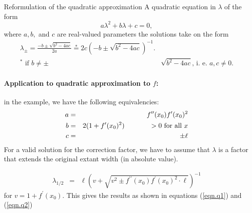 \documentclass[11pt]{isuthesis}\usepackage[]{graphicx}\usepackage[]{color}
\begin{document}
\begin{subsubsection}{Reformulation of the quadratic approximation}\label{app.quadratic}
A quadratic equation in $\lambda$ of the form 
\begin{equation}\label{quadratic.equation}
a\lambda^2 + b\lambda + c = 0,
\end{equation}
where $a, b,$ and $c$ are real-valued parameters the solutions take on the form
\begin{eqnarray*}
\lambda_{\pm} = \frac{-b \pm \sqrt{b^2 - 4ac}}{2a}
\stackrel{*}{=} 2c\left(-b \pm \sqrt{b^2 - 4ac}\right)^{-1}.\\
^*\text{ if } b \neq \pm &\sqrt{b^2 - 4ac}\text{, i.~e. }a, c \neq 0.
\end{eqnarray*}

\paragraph{Application to quadratic approximation to $f$:}
in the example, we have the following equivalencies:
\begin{eqnarray*}
a &=& f^{\prime\prime}(x_0) f^\prime(x_0)^2 \\
b &=& 2(1 + f^\prime(x_0)^2) \hspace{.5in} > 0 \text{ for all } x \\
c &=& \pm \ell 
\end{eqnarray*}
For a valid solution for the correction factor, we have to assume that $\lambda$ is a factor that extends the original extant width (in absolute value). 

\begin{eqnarray*}
\lambda_{1/2} &=& \ell \left(v + \sqrt{ v^2 \pm  f^{\prime\prime}(x_0) f^\prime(x_0)^2\cdot \ell}\right)^{-1} 
\end{eqnarray*}
for $v = 1 + f^\prime(x_0)$. 
This gives the results as shown in equations (\ref{eqn.q1}) and (\ref{eqn.q2})
\end{subsubsection}
\end{document}
